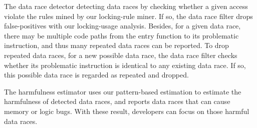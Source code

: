  The data race 
detector detecting data races by checking whether a given access violate the 
rules mined by our locking-rule miner. If so, the data race filter drops 
false-positives with our locking-usage analysis. Besides, for a given data 
race, there may be multiple code paths from the entry function to its 
problematic instruction, and thus many repeated data races can be reported.  
To drop repeated data races, for a new possible data race, the data race filter 
checks whether its problematic instruction is identical to any existing data 
race. If so, this possible data race is regarded as repeated and dropped.

 The harmfulness estimator uses our 
pattern-based estimation to estimate the harmfulness of detected data races, 
and reports data races that can cause memory or logic bugs. With these result, 
developers can focus on those harmful data races.